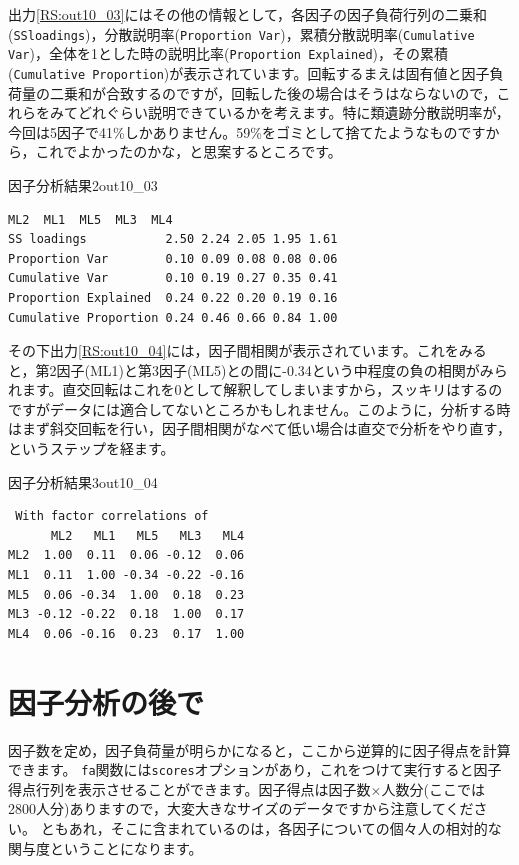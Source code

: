 \documentclass{ltjsbook}
\begin{document}
出力\ref{RS:out10_03}にはその他の情報として，各因子の因子負荷行列の二乗和(\verb|SSloadings|)，分散説明率(\verb|Proportion Var|)，累積分散説明率(\verb|Cumulative Var|)，全体を1とした時の説明比率(\verb|Proportion Explained|)，その累積(\verb|Cumulative Proportion|)が表示されています。回転するまえは固有値と因子負荷量の二乗和が合致するのですが，回転した後の場合はそうはならないので，これらをみてどれぐらい説明できているかを考えます。特に類遺跡分散説明率が，今回は5因子で41\%しかありません。59\%をゴミとして捨てたようなものですから，これでよかったのかな，と思案するところです。

\begin{Rscreen}{因子分析結果2}{out10_03}
    \begin{verbatim}
ML2  ML1  ML5  ML3  ML4
SS loadings           2.50 2.24 2.05 1.95 1.61
Proportion Var        0.10 0.09 0.08 0.08 0.06
Cumulative Var        0.10 0.19 0.27 0.35 0.41
Proportion Explained  0.24 0.22 0.20 0.19 0.16
Cumulative Proportion 0.24 0.46 0.66 0.84 1.00
\end{verbatim}
\end{Rscreen}

その下出力\ref{RS:out10_04}には，因子間相関が表示されています。これをみると，第2因子(ML1)と第3因子(ML5)との間に-0.34という中程度の負の相関がみられます。直交回転はこれを0として解釈してしまいますから，スッキリはするのですがデータには適合してないところかもしれません。このように，分析する時はまず斜交回転を行い，因子間相関がなべて低い場合は直交で分析をやり直す，というステップを経ます。

\begin{Rscreen}{因子分析結果3}{out10_04}
    \begin{verbatim}
 With factor correlations of 
      ML2   ML1   ML5   ML3   ML4
ML2  1.00  0.11  0.06 -0.12  0.06
ML1  0.11  1.00 -0.34 -0.22 -0.16
ML5  0.06 -0.34  1.00  0.18  0.23
ML3 -0.12 -0.22  0.18  1.00  0.17
ML4  0.06 -0.16  0.23  0.17  1.00
\end{verbatim}
\end{Rscreen}

\section{因子分析の後で} 

因子数を定め，因子負荷量が明らかになると，ここから逆算的に因子得点を計算できます。
\texttt{fa}関数には\texttt{scores}オプションがあり，これをつけて実行すると因子得点行列を表示させることができます。因子得点は因子数$\times$人数分(ここでは2800人分)ありますので，大変大きなサイズのデータですから注意してください。
ともあれ，そこに含まれているのは，各因子についての個々人の相対的な関与度ということになります。
\end{document}
